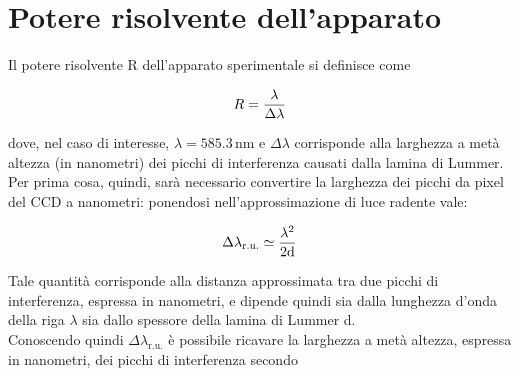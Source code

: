 \documentclass[twocolumn,10pt]{asme2ej}
\begin{document}
\section{Potere risolvente dell'apparato}\label{s:risolvente}



Il potere risolvente R dell'apparato sperimentale si definisce come

\vspace{-15pt}
\begin{equation}
    R = \frac{\lambda}{\Delta\lambda}
    \label{e:r}
\vspace{-5pt}
\end{equation}

dove, nel caso di interesse, $\lambda = 585.3 \,\si{\nano\metre}$ e $\Delta\lambda$ corrisponde alla larghezza a metà
altezza (in nanometri) dei picchi di interferenza causati dalla lamina di Lummer. Per prima cosa, quindi, sarà
necessario convertire la larghezza dei picchi da pixel del CCD a nanometri: ponendosi nell'approssimazione di luce
radente vale:

\vspace{-10pt}
\begin{equation}
    \Delta\lambda_{\text{r.u.}} \simeq \frac{\lambda^2}{2\text{d}}
    \label{e:dlambdaru}
\vspace{-5pt}
\end{equation}

Tale quantità corrisponde alla distanza approssimata tra due picchi di interferenza, espressa in nanometri, e dipende
quindi sia dalla lunghezza d'onda della riga $\lambda$ sia dallo spessore della lamina di Lummer d.\\
Conoscendo quindi $\Delta\lambda_{\text{r.u.}}$ è possibile ricavare la larghezza a metà altezza, espressa in nanometri,
dei picchi di interferenza secondo
\end{document}
